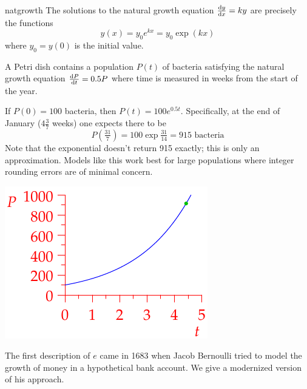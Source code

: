 \begin{thm}{}{natgrowth}
	The solutions to the natural growth equation $\diff[y]{x}=ky$ are precisely the functions
	\[
		y(x)=y_0e^{kx} =y_0\exp(kx)
	\]
	where $y_0=y(0)$ is the initial value.
\end{thm}



\begin{example}{}{}
	A Petri dish contains a population $P(t)$ of bacteria satisfying the natural growth equation $\diff[P]{t}=0.5P$ where time is measured in weeks from the start of the year.\par
	\begin{minipage}[t]{0.63\linewidth}\vspace{-2pt}
		If $P(0)=100$ bacteria, then $P(t)=100e^{0.5t}$. Specifically, at the end of January ($4\frac 37$ weeks) one expects there to be
		\[
			P(\tfrac{31}7)=100\exp\tfrac{31}{14}=915\text{ bacteria}
		\]
		Note that the exponential doesn't return 915 exactly; this is only an approximation. Models like this work best for large populations where integer rounding errors are of minimal concern.
	\end{minipage}
	\hfill
	\begin{minipage}[t]{0.35\linewidth}\vspace{-5pt}
		\flushright\includegraphics{bacteria}
	\end{minipage}
\end{example}



The first description of $e$ came in 1683 when Jacob Bernoulli tried to model the growth of money in a hypothetical bank account. We give a modernized version of his approach.

